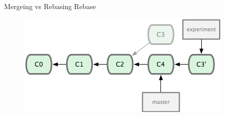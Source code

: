 \documentclass[14pt]{beamer}
\begin{document}
\begin{frame}{Mergeing vs Rebasing}
        Rebase
	\begin{figure}[htb]
		\centering
		\includegraphics[width=.7\textwidth]{rebase.png}
	\end{figure}
\end{frame}
\end{document}
